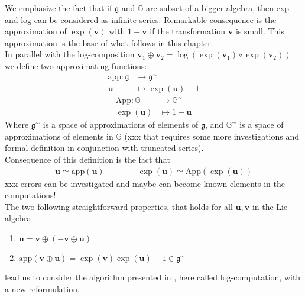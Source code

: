 \noindent
We emphasize the fact that if $\mathfrak{g}$ and $\mathbb{G}$ are subset of a bigger algebra, then exp and log can be considered as infinite series.
Remarkable consequence is the approximation of $\exp(\mathbf{v})$ with $1 + \mathbf{v}$ if the transformation $\mathbf{v}$ is small. This approximation is the base of what follows in this chapter.\\
In parallel with the log-composition $ \mathbf{v}_{1}\oplus \mathbf{v}_{2} =  \log(\exp(\mathbf{v}_1)\circ \exp(\mathbf{v}_2))$ 
we define two approximating functions:
\begin{align*}
\text{app} : \mathfrak{g} & \longrightarrow  \mathfrak{g} ^{\sim}    \\
\mathbf{u} &\longmapsto \exp(\mathbf{u}) - 1
\end{align*}
\begin{align*}
\text{App} : \mathbb{G} & \longrightarrow  \mathbb{G}^{\sim}   \\
\exp(\mathbf{u}) &\longmapsto 1 + \mathbf{u}
\end{align*}
Where $\mathfrak{g} ^{\sim}$ is a space of approximations of elements of $\mathfrak{g} $, and $\mathbb{G}^{\sim} $ is a space of approximations of elements in $\mathbb{G}$ (xxx that requires some more investigations and formal definition in conjunction with truncated series).\\
Consequence of this definition is the fact that
\begin{align*}
\mathbf{u} \simeq   \text{app} (\mathbf{u})
\qquad \qquad 
\exp(\mathbf{u}) \simeq   \text{App} (\exp(\mathbf{u})) 
\end{align*}
xxx errors can be investigated and maybe can become known elements in the computations! \\
The two following straightforward properties, that holds for all $\mathbf{u}, \mathbf{v} $ in the Lie algebra
\begin{enumerate}
	\item $\mathbf{u} = \mathbf{v} \oplus (-\mathbf{v} \oplus  \mathbf{u} )$
	\item $\text{app} (\mathbf{v} \oplus  \mathbf{u}) = \exp(\mathbf{v})\exp(\mathbf{u}) - 1 \in \mathfrak{g} ^{\sim}$
\end{enumerate}
lead us to consider the algorithm presented in \cite{Bossa:08}, here called log-computation, with a new reformulation. 

